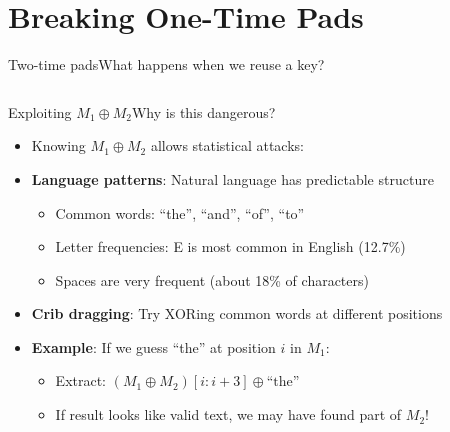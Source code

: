 \documentclass[aspectratio=169, lualatex, handout]{beamer}
\begin{document}
\section{Breaking One-Time Pads}

\begin{frame}{Two-time pads}{What happens when we reuse a key?}
	\begin{columns}[c]
	\end{columns}
\end{frame}

\begin{frame}{Exploiting $M_1 \oplus M_2$}{Why is this dangerous?}
	\begin{itemize}[<+->]
		\item Knowing $M_1 \oplus M_2$ allows statistical attacks:
		\item \textbf{Language patterns}: Natural language has predictable structure
		      \begin{itemize}[<+->]
			      \item Common words: ``the'', ``and'', ``of'', ``to''
			      \item Letter frequencies: E is most common in English (12.7\%)
			      \item Spaces are very frequent (about 18\% of characters)
		      \end{itemize}
		\item \textbf{Crib dragging}: Try XORing common words at different positions
		\item \textbf{Example}: If we guess ``the'' at position $i$ in $M_1$:
		      \begin{itemize}[<+->]
			      \item Extract: $(M_1 \oplus M_2)[i:i+3] \oplus \text{``the''}$
			      \item If result looks like valid text, we may have found part of $M_2$!
		      \end{itemize}
	\end{itemize}
\end{frame}
\end{document}
